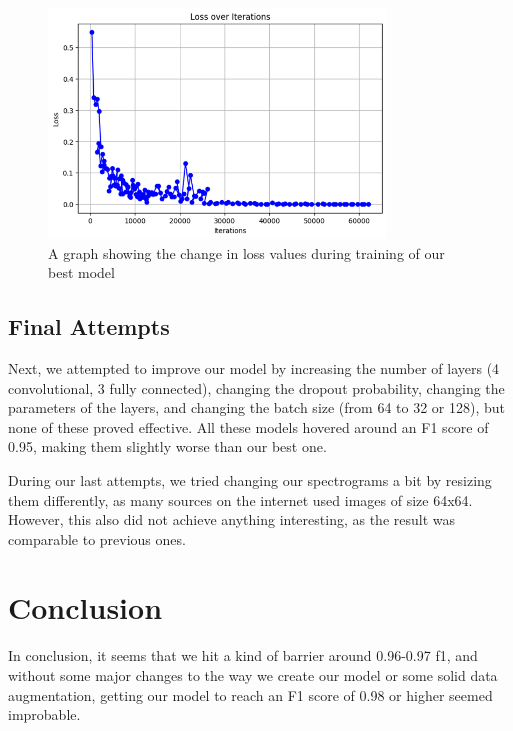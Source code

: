 \documentclass[11pt, letterpaper]{article}
\begin{document}
\begin{figure}[H]
    \centering
    \includegraphics[width=0.8\textwidth]{lossplot2.png}
    \caption{A graph showing the change in loss values during training of our best model}
\end{figure}

\subsection{Final Attempts}

Next, we attempted to improve our model by increasing the number of layers (4 convolutional, 3 fully connected), changing the dropout probability, changing the parameters of the layers, and changing the batch size (from 64 to 32 or 128), but none of these proved effective. All these models hovered around an F1 score of 0.95, making them slightly worse than our best one.

During our last attempts, we tried changing our spectrograms a bit by resizing them differently, as many sources on the internet used images of size 64x64. However, this also did not achieve anything interesting, as the result was comparable to previous ones.

\section{Conclusion}

In conclusion, it seems that we hit a kind of barrier around 0.96-0.97 f1, and without some major changes to the way we create our model or some solid data augmentation, getting our model to reach an F1 score of 0.98 or higher seemed improbable.
\end{document}
